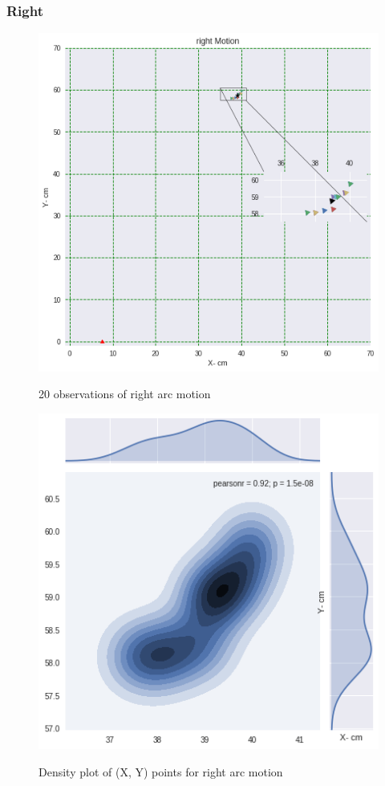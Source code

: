 \documentclass[11pt,a4paper]{article}
\begin{document}
\begin{itemize}
\subsubsection{Right}
\begin{figure}[H]
\centering	
\includegraphics[width=1.2\linewidth]{right_cm}
\label{fig:right}
\caption{20 observations of right arc motion}
\end{figure}

\begin{figure}[H]
\centering	
\includegraphics[width=0.8\linewidth]{rightG}
\label{fig:sub1}
\caption{Density plot of (X, Y) points for right arc motion}
\end{figure}


\end{itemize}
\end{document}
